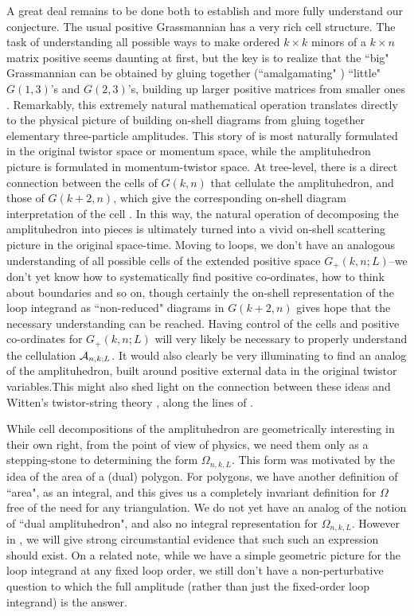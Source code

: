 \documentclass[12pt,nohyper,twosided]{JHEP3}
\begin{document}
A great deal remains to be done both to establish and more fully
understand our conjecture. The usual  positive Grassmannian has a
very rich cell structure. The task of understanding all possible
ways to make ordered $k \times k$ minors of a $k \times n$ matrix
positive seems daunting at first, but the key is to realize that the
``big" Grassmannian can be obtained by gluing together
(``amalgamating" \cite{FG}) ``little" $G(1,3)$'s and $G(2,3)$'s,
building up larger positive matrices from smaller ones \cite{N6}.
Remarkably, this extremely natural mathematical operation translates
directly to the physical picture of building on-shell diagrams from
gluing together elementary three-particle amplitudes.  This story of
\cite{N6} is most naturally formulated in the original twistor space
or momentum space, while the amplituhedron picture  is formulated in
momentum-twistor space. At tree-level, there is a direct  connection
between the cells of $G(k,n)$ that cellulate the amplituhedron, and
those of $G(k+2,n)$, which give the corresponding on-shell diagram
interpretation of the cell \cite{N6}.  In this way, the natural
operation of decomposing the amplituhedron into pieces is ultimately
turned into a vivid on-shell scattering picture in the original
space-time.  Moving to loops, we don't have an analogous
understanding of all possible cells of the extended positive space
$G_+(k,n;L)$--we don't yet know how to systematically find positive
co-ordinates, how to think about boundaries and so on, though
certainly the on-shell representation of the loop integrand as
``non-reduced" diagrams  in $G(k+2,n)$ \cite{N6} gives hope that the
necessary understanding can be reached. Having control of  the cells
and positive co-ordinates for  $G_+(k,n;L)$ will very likely be
necessary to properly understand the cellulation ${\cal A}_{n,k;L}$.
It would also clearly be very illuminating to find an analog of the
amplituhedron, built around  positive external data in the original
twistor variables.This might also shed light on the connection
between these ideas and Witten's twistor-string theory
\cite{Witten:2003nn,Roiban:2004ix}, along the lines of
\cite{Dolan:2009wf, Nandan:2009cc, ArkaniHamed:2009dg,
Bourjaily:2010kw}.

While cell decompositions of the amplituhedron are geometrically
interesting in their own right, from the point of view of physics,
we need them only as a stepping-stone to determining the form
$\Omega_{n,k,L}$. This form was motivated by the idea of the area of
a (dual) polygon. For polygons, we have another definition of
``area", as an integral, and this gives us a completely invariant
definition for $\Omega$  free of the need for any triangulation. We
do not yet have an analog of the notion of ``dual amplituhedron",
and also  no integral representation for $\Omega_{n,k,L}$. However
in  \cite{Threeviews}, we will give strong circumstantial evidence
that such such an expression should exist. On a related note, while
we have a simple geometric picture for the loop integrand at any
fixed loop order, we still don't have a non-perturbative question to
which  the full amplitude (rather than just the fixed-order loop
integrand) is the answer.
\end{document}
